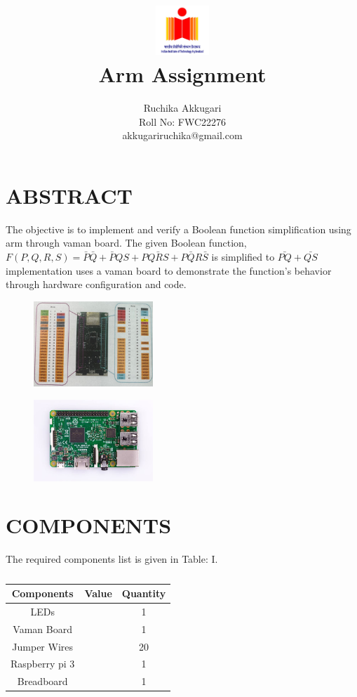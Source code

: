 \documentclass[conference]{IEEEtran}
\title{
\vspace{1cm}
{\includegraphics[width=0.15\textwidth]{iithlogo.jpg } \\ Arm Assignment} }
\author{Ruchika Akkugari\\ Roll No: FWC22276\\ akkugariruchika@gmail.com}
\begin{document}
\maketitle
 \section {ABSTRACT}
 The objective is to implement and verify a Boolean function simplification using arm through vaman board. The given Boolean function,$F(P,Q,R,S)=\bar{P}\bar{Q}+\bar{P}QS+P\bar{QRS}+P\bar{Q}R\bar{S}$ is simplified to $\bar{PQ}+\bar{QS}$
 implementation uses a vaman board to demonstrate the function’s behavior through hardware configuration and code.
 \begin{figure}[h]
	 \centering
	 \includegraphics[width=0.4\textwidth]{vaman.jpg}       
\caption{\label{fig:1}}
 \end{figure}
 \begin{figure}[h]
 \centering
 \includegraphics[width=0.4\textwidth]{piii.jpeg}
 \caption{\label{fig:1}}
 \end{figure}
\section{COMPONENTS}
The required components list is given in Table: I. 

 \begin{table} [htbp]
\centering
\begin{tabular}{| c | c | c |} \hline
Components & Value & Quantity \\\hline
LEDs &  & 1 \\ \hline
Vaman Board &  & 1 \\ \hline
Jumper Wires &  & 20 \\ \hline
	Raspberry pi 3 & & 1 \\ \hline
Breadboard & & 1 \\ 
\hline
\end{tabular}
\vspace{0.1cm}
\caption{\label{tab:widgets}}
\end{table}
\end{document}
